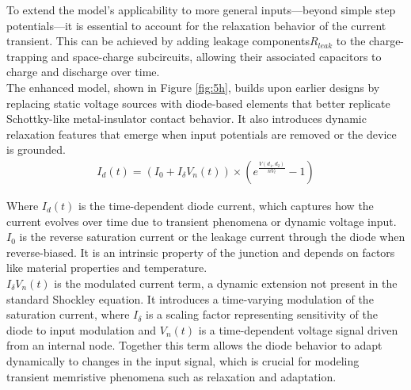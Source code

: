 

\noindent To extend the model's applicability to more general inputs—beyond simple step potentials—it is essential to account for the relaxation behavior of the current transient. This can be achieved by adding leakage components$R_{leak}$  to the charge-trapping and space-charge subcircuits, allowing their associated capacitors to charge and discharge over time.\\

\noindent The enhanced model, shown in Figure \ref{fig:5h}, builds upon earlier designs by replacing static voltage sources with diode-based elements that better replicate Schottky-like metal-insulator contact behavior. It also introduces dynamic relaxation features that emerge when input potentials are removed or the device is grounded.
\begin{align}
I_d(t) = \left( I_0 + I_{\delta} V_n(t) \right)\times \left( e^{\frac{V(d_1,d_2)}{nV_t} }  - 1\right) \label{eq:5.8}
\end{align}

\noindent Where $I_d(t)$ is the time-dependent diode current, which captures how the current evolves over time due to transient phenomena or dynamic voltage input. $I_0$ is the reverse saturation current or the leakage current through the diode when reverse-biased. It is an intrinsic property of the junction and depends on factors like material properties and temperature. \\

\noindent $I_{\delta} V_n(t)$ is the modulated current term, a dynamic extension not present in the standard Shockley equation. It introduces a time-varying modulation of the saturation current, where $I_{\delta}$ is a scaling factor representing sensitivity of the diode to input modulation and $V_n(t)$ is a time-dependent voltage signal driven from an internal node. Together this term allows the diode behavior to adapt dynamically to changes in the input signal, which is crucial for modeling transient memristive phenomena such as relaxation and adaptation.\\

